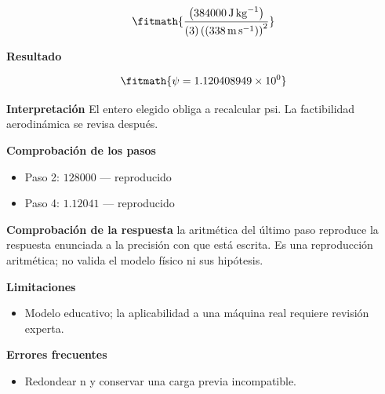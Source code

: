 \documentclass[10pt,openany]{book}
\begin{document}
\begin{tcolorbox}[title={Problema resuelto 3}, studiumworked, breakable]
\[
\fitmath{\frac{\left(384000\,\mathrm{J}\,\mathrm{kg}^{-1}\right)}{\left(3\right) \left(\left(338\,\mathrm{m}\,\mathrm{s}^{-1}\right)\right)^{2}}}
\]

\noindent\textbf{Resultado}

\[
\fitmath{\psi=1.120408949\times10^{0}}
\]

\noindent\textbf{Interpretación}
El entero elegido obliga a recalcular psi. La factibilidad aerodinámica se revisa después.

\noindent\textbf{Comprobación de los pasos}
\begin{itemize}
\item Paso 2: $128000$ — reproducido
\item Paso 4: $1.12041$ — reproducido
\end{itemize}

\noindent\textbf{Comprobación de la respuesta} la aritmética del último paso reproduce la respuesta enunciada a la precisión con que está escrita. Es una reproducción aritmética; no valida el modelo físico ni sus hipótesis.

\noindent\textbf{Limitaciones}
\begin{itemize}
\item Modelo educativo; la aplicabilidad a una máquina real requiere revisión experta.
\end{itemize}

\noindent\textbf{Errores frecuentes}
\begin{itemize}
\item Redondear n y conservar una carga previa incompatible.
\end{itemize}
\end{tcolorbox}
\end{document}
